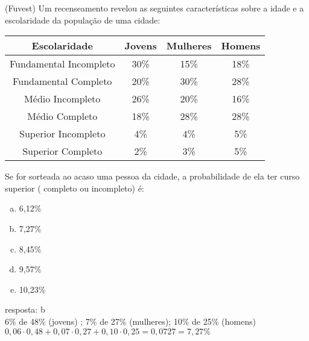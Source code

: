 \begin{ex}
(Fuvest) Um recenseamento revelou as seguintes características sobre a idade e a escolaridade da população de uma cidade:
 \begin{center}

\end{center}
\begin{center}
   
   \begin{tabular}{|c|c|c|c|} \hline
    Escolaridade     & Jovens & Mulheres & Homens   \\ \hline
    Fundamental Incompleto  & 30\%    & 15\%   & 18\%  \\ \hline
    Fundamental Completo  & 20\%     & 30\%   &  28\%   \\  \hline
    Médio Incompleto  &  26\%  &  20\%  & 16\%  \\  \hline
    Médio Completo  &  18\%  &  28\%  &  28\%  \\  \hline
    Superior Incompleto & 4\%  &  4\%  &  5\%  \\  \hline
    Superior Completo & 2\%  & 3\%  & 5\%  \\   \hline
   \end{tabular}
\end{center}

Se for sorteada ao acaso uma pessoa da cidade, a probabilidade de ela ter curso superior ( completo ou incompleto) é:
   \begin{enumerate}[(a)]
   \item 6,12\%
   \item 7,27\%
   \item 8,45\%
   \item 9,57\%
   \item 10,23\%
   \end{enumerate}

  \begin{sol}
   resposta: b \\
   6\% de 48\% (jovens) ; 7\% de 27\% (mulheres); 10\% de 25\% (homens) \\
   $0,06\cdot0,48+0,07\cdot0,27+0,10\cdot0,25=0,0727=7,27\%$
   \end{sol}
\end{ex}